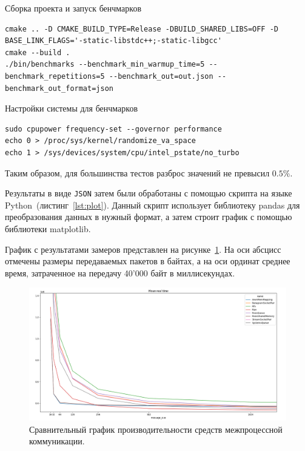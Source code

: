 \documentclass[14pt, russian]{scrartcl}
\newcommand{\refAlgo}[1]{(листинг~\ref{#1})}
\begin{document}
\begin{listing}[H]
  \caption{Сборка проекта и запуск бенчмарков}
  \label{lst:build}
  \begin{verbatim}
cmake .. -D CMAKE_BUILD_TYPE=Release -DBUILD_SHARED_LIBS=OFF -D BASE_LINK_FLAGS='-static-libstdc++;-static-libgcc'
cmake --build .
./bin/benchmarks --benchmark_min_warmup_time=5 --benchmark_repetitions=5 --benchmark_out=out.json --benchmark_out_format=json
  \end{verbatim}
\end{listing}

\begin{listing}[H]
  \caption{Настройки системы для бенчмарков}
  \label{lst:tweaks}
  \begin{verbatim}
sudo cpupower frequency-set --governor performance
echo 0 > /proc/sys/kernel/randomize_va_space
echo 1 > /sys/devices/system/cpu/intel_pstate/no_turbo
  \end{verbatim}
\end{listing}

Таким образом, для большинства тестов разброс значений не превысил $0.5\%$.

Результаты в виде \verb|JSON| затем были обработаны с помощью скрипта на языке
Python~\refAlgo{lst:plot}. Данный скрипт использует библиотеку pandas для
преобразования данных в нужный формат, а затем строит график с помощью
библиотеки matplotlib.

График с результатами замеров представлен на рисунке~\ref{fig:performance}. На
оси абсцисс отмечены размеры передаваемых пакетов в байтах, а на оси ординат
среднее время, затраченное на передачу 40'000 байт в миллисекундах.

\begin{figure}[H]
  \centering
  \begin{minipage}[t]{\textwidth}
    \centering
    \includegraphics[width=\textwidth]{./imgs/performance.png}
  \end{minipage}
  \caption{Сравнительный график производительности средств межпроцессной
    коммуникации.}
  \label{fig:performance}
\end{figure}
\end{document}
